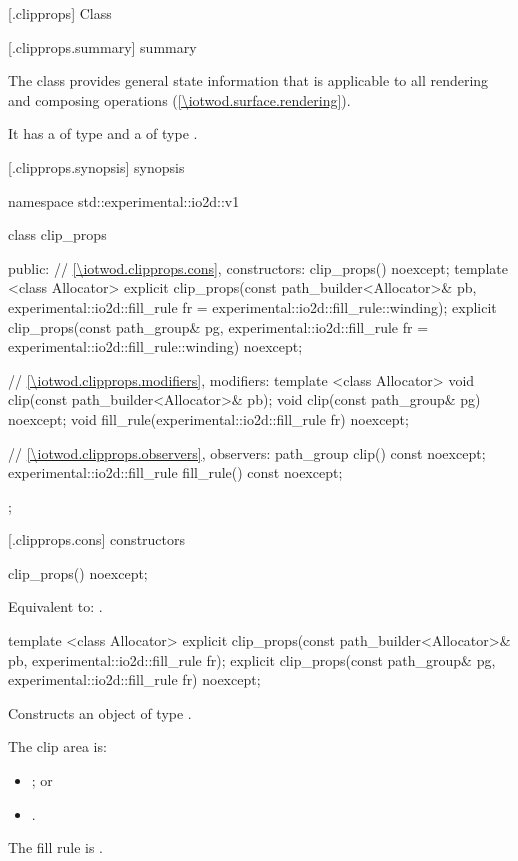 
 [\iotwod.clipprops] {Class }

 [\iotwod.clipprops.summary] { summary}

\pnum
The  class provides general state information that is applicable to all rendering and composing operations (\ref{\iotwod.surface.rendering}).

\pnum
It has a  of type  and a  of type .

 [\iotwod.clipprops.synopsis] { synopsis}

\begin{codeblock}
namespace std::experimental::io2d::v1 {
  class clip_props {
  public:
    // \ref{\iotwod.clipprops.cons}, constructors:
    clip_props() noexcept;
    template <class Allocator>
    explicit clip_props(const path_builder<Allocator>& pb,
      experimental::io2d::fill_rule fr = 
      experimental::io2d::fill_rule::winding);
    explicit clip_props(const path_group& pg, experimental::io2d::fill_rule fr =
      experimental::io2d::fill_rule::winding) noexcept;

    // \ref{\iotwod.clipprops.modifiers}, modifiers:
    template <class Allocator>
    void clip(const path_builder<Allocator>& pb);
    void clip(const path_group& pg) noexcept;
    void fill_rule(experimental::io2d::fill_rule fr) noexcept;
    
    // \ref{\iotwod.clipprops.observers}, observers:
    path_group clip() const noexcept;
    experimental::io2d::fill_rule fill_rule() const noexcept;
  };
}
\end{codeblock}

 [\iotwod.clipprops.cons] { constructors}

%
\begin{itemdecl}
clip_props() noexcept;
\end{itemdecl}
\begin{itemdescr}
\pnum
\effects
Equivalent to: .
\end{itemdescr}

%
\begin{itemdecl}
template <class Allocator>
explicit clip_props(const path_builder<Allocator>& pb,
  experimental::io2d::fill_rule fr);
explicit clip_props(const path_group& pg, experimental::io2d::fill_rule fr) 
  noexcept;
\end{itemdecl}
\begin{itemdescr}
\pnum
\effects
Constructs an object of type .

\pnum
The clip area is:
\begin{itemize}
\item {}; or
\item {}.
\end{itemize}

\pnum
The fill rule is .
\end{itemdescr}

